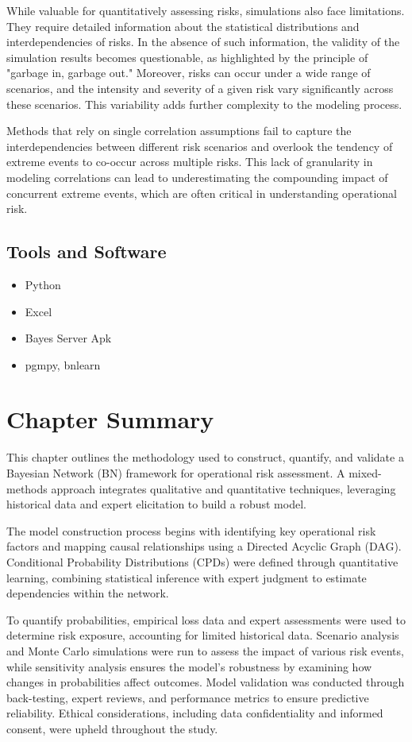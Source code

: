 While valuable for quantitatively assessing risks, simulations also face limitations. They require detailed information about the statistical distributions and interdependencies of risks. In the absence of such information, the validity of the simulation results becomes questionable, as highlighted by the principle of "garbage in, garbage out." Moreover, risks can occur under a wide range of scenarios, and the intensity and severity of a given risk vary significantly across these scenarios. This variability adds further complexity to the modeling process.

Methods that rely on single correlation assumptions fail to capture the interdependencies between different risk scenarios and overlook the tendency of extreme events to co-occur across multiple risks. This lack of granularity in modeling correlations can lead to underestimating the compounding impact of concurrent extreme events, which are often critical in understanding operational risk. 
 
 \subsection{Tools and Software }
\begin{itemize}
    \item Python
    \item Excel
    \item Bayes Server Apk
    \item pgmpy, bnlearn
\end{itemize}
\section{Chapter Summary}
This chapter outlines the methodology used to construct, quantify, and validate a Bayesian Network (BN) framework for operational risk assessment. A mixed-methods approach integrates qualitative and quantitative techniques, leveraging historical data and expert elicitation to build a robust model.  

The model construction process begins with identifying key operational risk factors and mapping causal relationships using a Directed Acyclic Graph (DAG). Conditional Probability Distributions (CPDs) were defined through quantitative learning, combining statistical inference with expert judgment to estimate dependencies within the network. 

To quantify probabilities, empirical loss data and expert assessments were used to determine risk exposure, accounting for limited historical data. Scenario analysis and Monte Carlo simulations were run to assess the impact of various risk events, while sensitivity analysis ensures the model's robustness by examining how changes in probabilities affect outcomes. Model validation was conducted through back-testing, expert reviews, and performance metrics to ensure predictive reliability. Ethical considerations, including data confidentiality and informed consent, were upheld throughout the study.  


